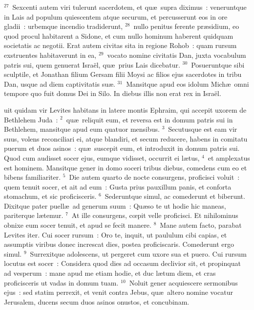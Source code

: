 ${}^{27}$~Sexcenti autem viri tulerunt sacerdotem, et qu\ae\ supra diximus~: veneruntque in Lais ad populum quiescentem atque securum, et percusserunt eos in ore gladii~: urbemque incendio tradiderunt,
${}^{28}$~nullo penitus ferente pr\ae sidium, eo quod procul habitarent a Sidone, et cum nullo hominum haberent quidquam societatis ac negotii. Erat autem civitas sita in regione Rohob~: quam rursum exstruentes habitaverunt in ea,
${}^{29}$~vocato nomine civitatis Dan, juxta vocabulum patris sui, quem genuerat Isra\"el, qu\ae\ prius Lais dicebatur.
${}^{30}$~Posueruntque sibi sculptile, et Jonathan filium Gersam filii Moysi ac filios ejus sacerdotes in tribu Dan, usque ad diem captivitatis su\ae .
${}^{31}$~Mansitque apud eos idolum Mich\ae\ omni tempore quo fuit domus Dei in Silo. In diebus illis non erat rex in Isra\"el.

\bchapter
{}uit quidam vir Levites habitans in latere montis Ephraim, qui accepit uxorem de Bethlehem Juda~:
${}^{2}$~qu\ae\ reliquit eum, et reversa est in domum patris sui in Bethlehem, mansitque apud eum quatuor mensibus.
${}^{3}$~Secutusque est eam vir suus, volens reconciliari ei, atque blandiri, et secum reducere, habens in comitatu puerum et duos asinos~: qu\ae\ suscepit eum, et introduxit in domum patris sui. Quod cum audisset socer ejus, eumque vidisset, occurrit ei l\ae tus,
${}^{4}$~et amplexatus est hominem. Mansitque gener in domo soceri tribus diebus, comedens cum eo et bibens familiariter.
${}^{5}$~Die autem quarto de nocte consurgens, proficisci voluit~: quem tenuit socer, et ait ad eum~: Gusta prius pauxillum panis, et conforta stomachum, et sic proficisceris.
${}^{6}$~Sederuntque simul, ac comederunt et biberunt. Dixitque pater puell\ae\ ad generum suum~: Qu\ae so te ut hodie hic maneas, pariterque l\ae temur.
${}^{7}$~At ille consurgens, cœpit velle proficisci. Et nihilominus obnixe eum socer tenuit, et apud se fecit manere.
${}^{8}$~Mane autem facto, parabat Levites iter. Cui socer rursum~: Oro te, inquit, ut paululum cibi capias, et assumptis viribus donec increscat dies, postea proficiscaris. Comederunt ergo simul.
${}^{9}$~Surrexitque adolescens, ut pergeret cum uxore sua et puero. Cui rursum locutus est socer~: Considera quod dies ad occasum declivior sit, et propinquat ad vesperum~: mane apud me etiam hodie, et duc l\ae tum diem, et cras proficisceris ut vadas in domum tuam.
${}^{10}$~Noluit gener acquiescere sermonibus ejus~: sed statim perrexit, et venit contra Jebus, qu\ae\ altero nomine vocatur Jerusalem, ducens secum duos asinos onustos, et concubinam.


